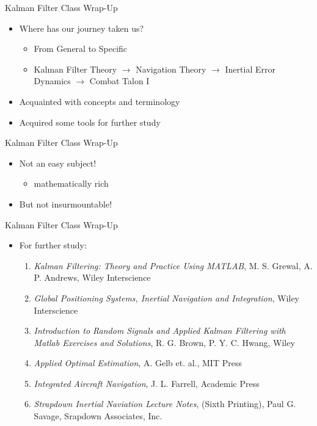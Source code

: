\begin{frame}
Kalman Filter Class Wrap-Up
\begin{itemize}
  \item Where has our journey taken us?
  \begin{itemize}
		\item From General to Specific
  		\item Kalman Filter Theory $\rightarrow$ Navigation Theory $\rightarrow$ Inertial Error Dynamics $\rightarrow$ Combat Talon I 
  \end{itemize}
  \item Acquainted with concepts and terminology
  \item Acquired some tools for further study
\end{itemize} 
\end{frame}

\begin{frame}
Kalman Filter Class Wrap-Up
\begin{itemize}
  \item Not an easy subject!
  \begin{itemize}
  	\item mathematically rich
  \end{itemize} 
  \item But not insurmountable!
\end{itemize} 
\end{frame}

\begin{frame}
Kalman Filter Class Wrap-Up
\begin{itemize}
  \item For further study:
  \begin{enumerate}
	\item \textit{Kalman Filtering: Theory and Practice Using MATLAB}, M. S. Grewal, A. P. Andrews, Wiley Interscience
	\item \textit{Global Positioning Systems, Inertial Navigation and Integration}, Wiley Interscience
	\item \textit{Introduction to Random Signals and Applied Kalman Filtering with Matlab Exercises and Solutions}, R. G. Brown, P. Y. C. Hwang, Wiley
	\item \textit{Applied Optimal Estimation}, A. Gelb et. al., MIT Press
	\item \textit{Integrated Aircraft Navigation}, J. L. Farrell, Academic Press
	\item \textit{Strapdown Inertial Naviation Lecture Notes}, (Sixth Printing), Paul G. Savage, Srapdown Associates, Inc.
  \end{enumerate}
\end{itemize} 
\end{frame}

